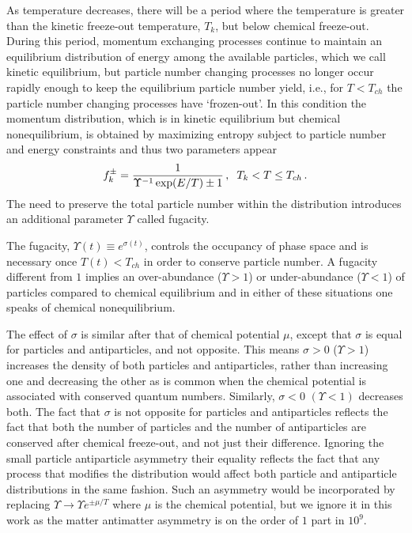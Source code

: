 As temperature decreases, there will be a period where the temperature is greater than the kinetic freeze-out temperature, $T_k$, but below chemical freeze-out. During this period, momentum exchanging processes continue to maintain an equilibrium distribution of energy among the available particles, which we call kinetic equilibrium, but particle number changing processes no longer occur rapidly enough to keep the equilibrium particle number yield, i.e., for $T<T_{ch}$ the particle number changing processes have `frozen-out'. In this condition the momentum distribution, which is in kinetic equilibrium but chemical nonequilibrium, is obtained by maximizing entropy subject to particle number and energy constraints and thus two parameters appear
\begin{equation}\label{k_eq}
f_{k}^\pm=\frac{1}{\Upsilon^{-1} \exp(E/T)\pm 1}\,,\hspace{2mm} T_k<T\leq T_{ch}\,.
\end{equation}
The need to preserve the total particle number within the distribution introduces an additional parameter $\Upsilon$ called fugacity. 

The fugacity, $\Upsilon(t)\equiv e^{\sigma(t)}$, controls the occupancy of phase space and is necessary once $T(t)<T_{ch}$ in order to conserve particle number. A fugacity different from $1$ implies an over-abundance ($\Upsilon>1$) or under-abundance ($\Upsilon<1$) of particles compared to chemical equilibrium and in either of these situations one speaks of chemical nonequilibrium. 

The effect of $\sigma$ is similar after that of chemical potential $\mu$, except that $\sigma$ is equal for particles and antiparticles, and not opposite. This means $\sigma>0$ ($\Upsilon>1$) increases the density of both particles and antiparticles, rather than increasing one and decreasing the other as is common when the chemical potential is associated with conserved quantum numbers. Similarly, $\sigma<0$ $(\Upsilon<1)$ decreases both. The fact that $\sigma$ is not opposite for particles and antiparticles reflects the fact that both the number of particles and the number of antiparticles are conserved after chemical freeze-out, and not just their difference. Ignoring the small particle antiparticle asymmetry their equality reflects the fact that any process that modifies the distribution would affect both particle and antiparticle distributions in the same fashion. Such an asymmetry would be incorporated by replacing $\Upsilon\rightarrow \Upsilon e^{\pm\mu/T}$ where $\mu$ is the chemical potential, but we ignore it in this work as the matter antimatter asymmetry is on the order of $1$ part in $10^9$.

